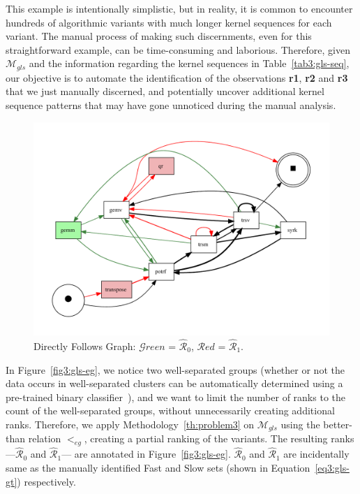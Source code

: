 \documentclass[acmsmall,screen, review]{acmart}
\begin{document}
This example is intentionally simplistic, but in reality, it is common to encounter hundreds of algorithmic variants with much longer kernel sequences for each variant. The manual process of making such discernments, even for this straightforward example, can be time-consuming and laborious. Therefore, given $\mathcal{M}_{gls}$ and the information regarding the kernel sequences in Table~\ref{tab3:gls-seq}, our objective is to automate the identification of the observations \textbf{r1}, \textbf{r2} and \textbf{r3} that we just manually discerned, and potentially uncover additional kernel sequence patterns that may have gone unnoticed during the manual analysis.

\begin{figure}[t!]
	\centering
	\includegraphics[width=.70\linewidth]{fig/ch3/gls-1000-100-dfg}
	\caption{Directly Follows Graph: $\mathcal{G}reen$ = $\hat{\mathcal{R}}_0$, $\mathcal{R}ed$ = $\mathcal{\hat{R}}_1$.}
	\label{fig:dfg-f}
\end{figure}

In Figure~\ref{fig3:gls-eg}, we notice two well-separated groups (whether or not the data occurs in well-separated clusters can be automatically determined using a pre-trained binary classifier~\cite{kumari2017machine}), and we want to limit the number of ranks to the count of the well-separated groups, without unnecessarily creating additional ranks. Therefore, we apply Methodology~\ref{th:problem3} on  $\mathcal{M}_{gls}$ using the better-than relation $<_{eg}$, creating a partial ranking of the variants.
The resulting ranks ---$\mathcal{\hat{R}}_0$ and $\mathcal{\hat{R}}_1$--- are annotated in Figure~\ref{fig3:gls-eg}. $\mathcal{\hat{R}}_0$ and $\mathcal{\hat{R}}_1$ are incidentally same as the manually identified Fast and Slow sets (shown in Equation~\ref{eq3:gls-gt}) respectively. 
\end{document}
